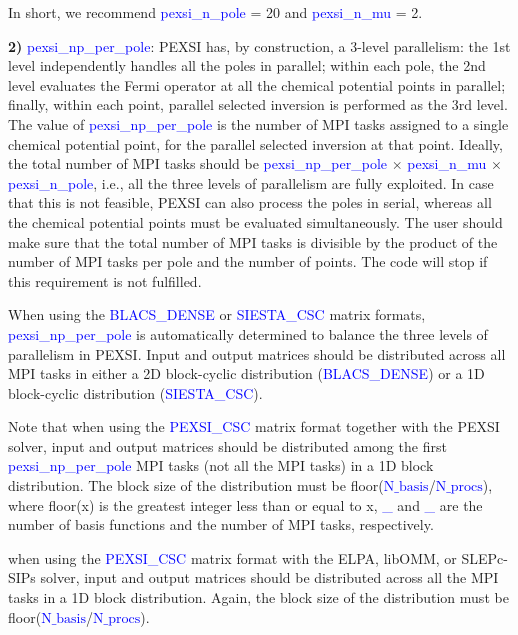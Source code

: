 \documentclass{report}
\begin{document}
In short, we recommend \textcolor{blue}{pexsi\_n\_pole} = 20 and \textcolor{blue}{pexsi\_n\_mu} = 2.

\textbf{2)} \textcolor{blue}{pexsi\_np\_per\_pole}:  PEXSI has, by construction, a 3-level parallelism:  the 1st level independently handles all the poles in parallel; within each pole, the 2nd level evaluates the Fermi operator at all the chemical potential points in parallel; finally, within each point, parallel selected inversion is performed as the 3rd level.  The value of \textcolor{blue}{pexsi\_np\_per\_pole} is the number of MPI tasks assigned to a single chemical potential point, for the parallel selected inversion at that point.  Ideally, the total number of MPI tasks should be \textcolor{blue}{pexsi\_np\_per\_pole} $\times$ \textcolor{blue}{pexsi\_n\_mu} $\times$ \textcolor{blue}{pexsi\_n\_pole}, i.e., all the three levels of parallelism are fully exploited.  In case that this is not feasible, PEXSI can also process the poles in serial, whereas all the chemical potential points must be evaluated simultaneously.  The user should make sure that the total number of MPI tasks is divisible by the product of the number of MPI tasks per pole and the number of points.  The code will stop if this requirement is not fulfilled.

When using the \textcolor{blue}{BLACS\_DENSE} or \textcolor{blue}{SIESTA\_CSC} matrix formats, \textcolor{blue}{pexsi\_np\_per\_pole} is automatically determined to balance the three levels of parallelism in PEXSI.  Input and output matrices should be distributed across all MPI tasks in either a 2D block-cyclic distribution (\textcolor{blue}{BLACS\_DENSE}) or a 1D block-cyclic distribution (\textcolor{blue}{SIESTA\_CSC}).

Note that when using the \textcolor{blue}{PEXSI\_CSC} matrix format together with the PEXSI solver, input and output matrices should be distributed among the first \textcolor{blue}{pexsi\_np\_per\_pole} MPI tasks (not all the MPI tasks) in a 1D block distribution.  The block size of the distribution must be floor(\textcolor{blue}{$\text{N}\_\text{basis}$}/\textcolor{blue}{$\text{N}\_\text{procs}$}), where floor(x) is the greatest integer less than or equal to x, \textcolor{blue}{\_} and \textcolor{blue}{\_} are the number of basis functions and the number of MPI tasks, respectively.

when using the \textcolor{blue}{PEXSI\_CSC} matrix format with the ELPA, libOMM, or SLEPc-SIPs solver, input and output matrices should be distributed across all the MPI tasks in a 1D block distribution.  Again, the block size of the distribution must be floor(\textcolor{blue}{$\text{N}\_\text{basis}$}/\textcolor{blue}{$\text{N}\_\text{procs}$}).
\end{document}
